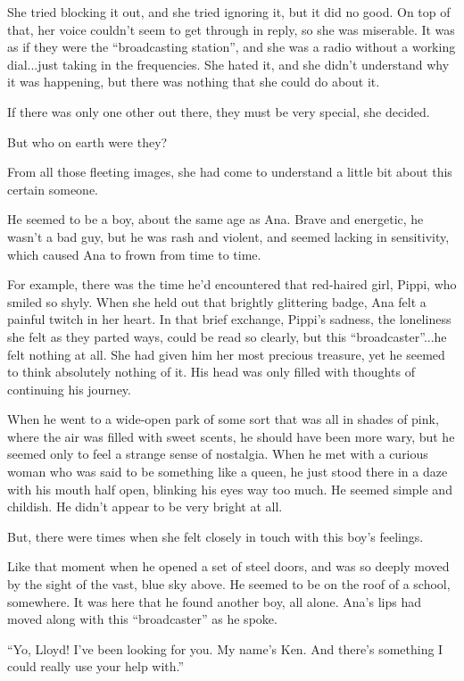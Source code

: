 \documentclass[
]{article}
\begin{document}
She tried blocking it out, and she tried ignoring it, but it did no
good. On top of that, her voice couldn't seem to get through in reply,
so she was miserable. It was as if they were the ``broadcasting
station'', and she was a radio without a working dial...just taking in
the frequencies. She hated it, and she didn't understand why it was
happening, but there was nothing that she could do about it.

If there was only one other out there, they must be very special, she
decided.

But who on earth were they?

From all those fleeting images, she had come to understand a little bit
about this certain someone.

He seemed to be a boy, about the same age as Ana. Brave and energetic,
he wasn't a bad guy, but he was rash and violent, and seemed lacking in
sensitivity, which caused Ana to frown from time to time.

For example, there was the time he'd encountered that red-haired girl,
Pippi, who smiled so shyly. When she held out that brightly glittering
badge, Ana felt a painful twitch in her heart. In that brief exchange,
Pippi's sadness, the loneliness she felt as they parted ways, could be
read so clearly, but this ``broadcaster''...he felt nothing at all. She
had given him her most precious treasure, yet he seemed to think
absolutely nothing of it. His head was only filled with thoughts of
continuing his journey.

When he went to a wide-open park of some sort that was all in shades of
pink, where the air was filled with sweet scents, he should have been
more wary, but he seemed only to feel a strange sense of nostalgia. When
he met with a curious woman who was said to be something like a queen,
he just stood there in a daze with his mouth half open, blinking his
eyes way too much. He seemed simple and childish. He didn't appear to be
very bright at all.

But, there were times when she felt closely in touch with this boy's
feelings.

Like that moment when he opened a set of steel doors, and was so deeply
moved by the sight of the vast, blue sky above. He seemed to be on the
roof of a school, somewhere. It was here that he found another boy, all
alone. Ana's lips had moved along with this ``broadcaster'' as he spoke.

``Yo, Lloyd! I've been looking for you. My name's Ken. And there's
something I could really use your help with.''
\end{document}
